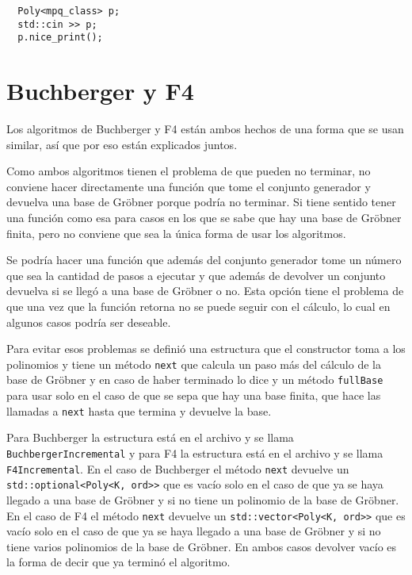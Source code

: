 \documentclass[12pt]{report}
\theoremstyle{customstyle}
\theoremstyle{factstyle}
\begin{document}
\begin{verbatim}
  Poly<mpq_class> p;
  std::cin >> p;
  p.nice_print();
\end{verbatim}

\section{Buchberger y F4}

Los algoritmos de Buchberger y F4 están ambos hechos de una forma que se usan similar, así que por eso están explicados juntos.

Como ambos algoritmos tienen el problema de que pueden no terminar, no conviene hacer directamente una función que tome el conjunto generador y devuelva una base de Gröbner porque podría no terminar. Si tiene sentido tener una función como esa para casos en los que se sabe que hay una base de Gröbner finita, pero no conviene que sea la única forma de usar los algoritmos.

Se podría hacer una función que además del conjunto generador tome un número que sea la cantidad de pasos a ejecutar y que además de devolver un conjunto devuelva si se llegó a una base de Gröbner o no. Esta opción tiene el problema de que una vez que la función retorna no se puede seguir con el cálculo, lo cual en algunos casos podría ser deseable.

Para evitar esos problemas se definió una estructura que el constructor toma a los polinomios y tiene un método \texttt{next} que calcula un paso más del cálculo de la base de Gröbner y en caso de haber terminado lo dice y un método \texttt{fullBase} para usar solo en el caso de que se sepa que hay una base finita, que hace las llamadas a \texttt{next} hasta que termina y devuelve la base.

Para Buchberger la estructura está en el archivo  y se llama \texttt{BuchbergerIncremental} y para F4 la estructura está en el archivo  y se llama \texttt{F4Incremental}. En el caso de Buchberger el método \texttt{next} devuelve un \texttt{std::optional<Poly<K, ord>>} que es vacío solo en el caso de que ya se haya llegado a una base de Gröbner y si no tiene un polinomio de la base de Gröbner. En el caso de F4 el método \texttt{next} devuelve un \texttt{std::vector<Poly<K, ord>>} que es vacío solo en el caso de que ya se haya llegado a una base de Gröbner y si no tiene varios polinomios de la base de Gröbner. En ambos casos devolver vacío es la forma de decir que ya terminó el algoritmo.
\end{document}
